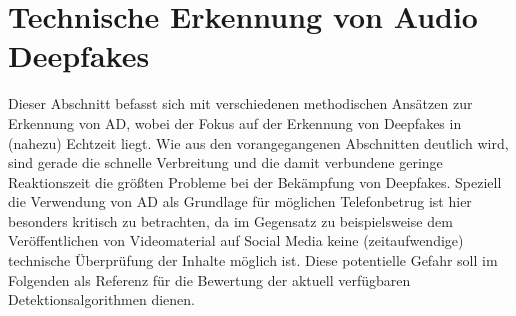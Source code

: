 \section{Technische Erkennung von Audio Deepfakes}
Dieser Abschnitt befasst sich mit verschiedenen methodischen Ansätzen zur Erkennung von AD, wobei der Fokus auf der Erkennung von Deepfakes in (nahezu) Echtzeit liegt.
Wie aus den vorangegangenen Abschnitten deutlich wird, sind gerade die schnelle Verbreitung und die damit verbundene geringe Reaktionszeit die größten Probleme bei der Bekämpfung von Deepfakes.
Speziell die Verwendung von AD als Grundlage für möglichen Telefonbetrug ist hier besonders kritisch zu betrachten, da im Gegensatz zu beispielsweise dem Veröffentlichen von Videomaterial auf Social Media keine (zeitaufwendige) technische Überprüfung der Inhalte möglich ist.
Diese potentielle Gefahr soll im Folgenden als Referenz für die Bewertung der aktuell verfügbaren Detektionsalgorithmen dienen.

